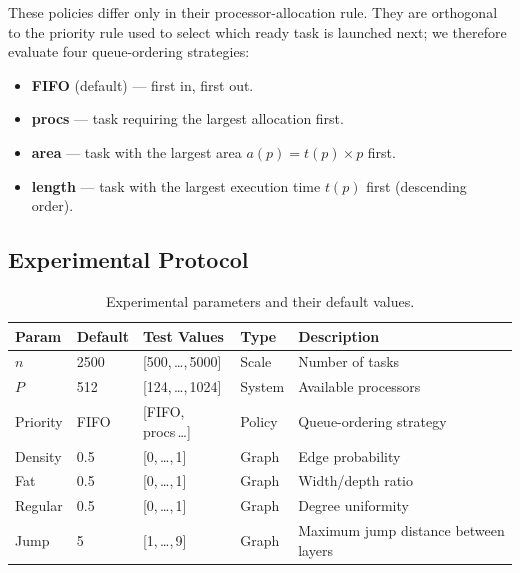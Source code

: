 \documentclass{article}
\begin{document}
These policies differ only in their processor-allocation rule.
They are orthogonal to the priority rule used to select which ready
task is launched next; we therefore evaluate four queue-ordering strategies:

\begin{itemize}
    \item \textbf{FIFO} (default) — first in, first out.
    \item \textbf{procs} — task requiring the largest allocation first.
    \item \textbf{area} — task with the largest area
          \(a(p)=t(p)\times p\) first.
    \item \textbf{length} — task with the largest execution time \(t(p)\) first
          (descending order).
\end{itemize}

\subsection{Experimental Protocol}
\label{sec:exp-protocol}





\begin{table}[ht]
    \centering
    \begin{tabular}{|l|l|l|l|l|}
        \hline
        \textbf{Param} & \textbf{Default} & \textbf{Test Values} & \textbf{Type} & \textbf{Description} \\ \hline
        $n$            & 2500             & [500,\,\dots,\,5000] & Scale   & Number of tasks \\ \hline
        $P$            & 512              & [124,\,\dots,\,1024] & System  & Available processors \\ \hline
        Priority       & FIFO             & [FIFO, procs\,\dots]       & Policy  & Queue-ordering strategy \\ \hline\hline
        Density        & 0.5              & [0,\,\dots,\,1]      & Graph   & Edge probability \\ \hline
        Fat            & 0.5              & [0,\,\dots,\,1]      & Graph   & Width/depth ratio \\ \hline
        Regular        & 0.5              & [0,\,\dots,\,1]      & Graph   & Degree uniformity \\ \hline
        Jump           & 5                & [1,\,\dots,\,9]      & Graph   & Maximum jump distance between layers \\ \hline
    \end{tabular}
    \caption{Experimental parameters and their default values.}
    \label{tab:exp-params}
\end{table}
\end{document}
